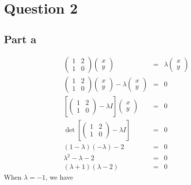 \section*{Question 2}
\subsection*{Part a}
\begin{eqnarray*}
\left(\begin{array}{cc}
1 & 2 \\
1 & 0
\end{array}\right)
\left(\begin{array}{c}
x \\
y
\end{array}\right) &=&
\lambda
\left(\begin{array}{c}
x \\
y
\end{array}\right) \\
\left(\begin{array}{cc}
1 & 2 \\
1 & 0
\end{array}\right)
\left(\begin{array}{c}
x \\
y
\end{array}\right) -
\lambda
\left(\begin{array}{c}
x \\
y
\end{array}\right) &=& 0 \\
\left[
\left(\begin{array}{cc}
1 & 2 \\
1 & 0
\end{array}\right)
- \lambda I
\right]
\left(\begin{array}{c}
x \\
y
\end{array}\right) &=& 0 \\
\det\left[
\left(\begin{array}{cc}
1 & 2 \\
1 & 0
\end{array}\right)
- \lambda I
\right] &=& 0 \\
(1 - \lambda)(-\lambda) - 2 &=& 0 \\
\lambda^2 - \lambda - 2 &=& 0 \\
(\lambda + 1)(\lambda - 2) &=& 0  
\end{eqnarray*}
When $ \lambda = -1 $, we have
